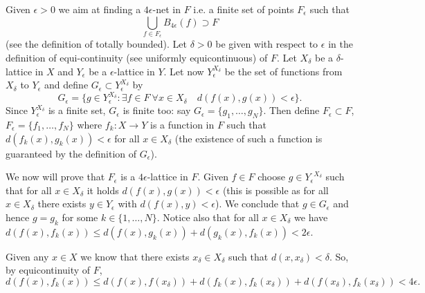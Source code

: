 \documentclass[12pt]{article}
\begin{document}
Given $\epsilon>0$ we aim at finding a $4\epsilon$-net in $F$ i.e. a finite set of points $F_\epsilon$ such that 
\[
  \bigcup_{f\in F_\epsilon} B_{4\epsilon}(f)\supset F
\]
(see the definition of totally bounded).
Let $\delta>0$ be given with respect to $\epsilon$ in the definition
of equi-continuity (see uniformly equicontinuous) of $F$.
Let $X_\delta$ be a $\delta$-lattice in
$X$ and $Y_\epsilon$ be a  $\epsilon$-lattice in $Y$. 
Let now $Y_\epsilon^{X_\delta}$ be the set of functions from
$X_\delta$ 
to $Y_\epsilon$ and define
$G_\epsilon\subset Y_\epsilon^{X_\delta}$ by
\[
  G_\epsilon = \{ g\in Y_\epsilon^{X_\delta}\colon 
	\exists f\in F\ \forall x\in X_\delta\quad d(f(x),g(x))<\epsilon\}.
\]
Since $Y_\epsilon^{X_\delta}$ is a finite set, 
$G_\epsilon$ is finite too: say $G_\epsilon=\{g_1,\ldots, g_N\}$.
Then define $F_\epsilon\subset F$, $F_\epsilon=\{f_1,\ldots, f_N\}$ 
where $f_k\colon X\to Y$ is a function in $F$ such that 
$d(f_k(x),g_k(x))<\epsilon$ for all $x\in X_\delta$ (the existence of
such a function is guaranteed by the definition of $G_\epsilon$).

We now will prove that $F_\epsilon$ is a $4\epsilon$-lattice in $F$.
Given $f\in F$ choose $g\in
{Y_\epsilon}^{X_\delta}$ such that for all $x\in X_\delta$ it holds
$d(f(x),g(x)) < \epsilon$ (this is possible as for all
$x\in X_\delta$ there exists $y\in Y_\epsilon$ with $d(f(x),y)<\epsilon$). 
We conclude that $g\in G_\epsilon$ and hence $g=g_k$ for some
$k\in\{1,\ldots, N\}$. Notice also that for all $x\in X_\delta$ we
have
 $d(f(x),f_k(x))\le d(f(x),g_k(x)) + d(g_k(x),f_k(x)) < 2\epsilon$.

Given any $x\in X$ we know that there exists
$x_\delta\in X_\delta$ such that $d(x,x_\delta)<\delta$. 
So, by equicontinuity of $F$, 
\[
  d(f(x),f_k(x)) \le
	d(f(x),f(x_\delta)) 
	+ d(f_k(x),f_k(x_\delta)) + d(f(x_\delta),f_k(x_\delta))
	< 4\epsilon.
\]
\end{document}
